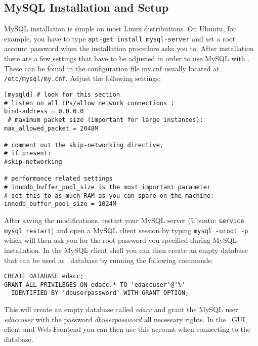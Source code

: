 \subsection{MySQL Installation and Setup}
MySQL installation is simple on most Linux distributions. On Ubuntu, for example, you
have to type \texttt{apt-get install mysql-server} and set a root account password
when the installation procedure asks you to.
 After installation there are a few settings
that have to be adjusted in order to use MySQL with \edacc. These can be found in the configuration file
my.cnf usually located at \texttt{/etc/mysql/my.cnf}. Adjust the following settings:
\begin{verbatim}
[mysqld] # look for this section
# listen on all IPs/allow network connections :
bind-address = 0.0.0.0
 # maximum packet size (important for large instances):
max_allowed_packet = 2048M

# comment out the skip-networking directive,
# if present:
#skip-networking

# performance related settings
# innodb_buffer_pool_size is the most important parameter
# set this to as much RAM as you can spare on the machine:
innodb_buffer_pool_size = 1024M
\end{verbatim}
After saving the modifications, restart your MySQL server (Ubuntu: \texttt{service mysql restart})
and open a MySQL client session by typing \texttt{mysql -uroot -p} which will then ask you for
the root password you specified during MySQL installation.
In the MySQL client shell you can then create an empty database that can be used as \edacc~database
by running the following commands:
\begin{verbatim}
CREATE DATABASE edacc;
GRANT ALL PRIVILEGES ON edacc.* TO 'edaccuser'@'%'
  IDENTIFIED BY 'dbuserpassword' WITH GRANT OPTION;
\end{verbatim}
This will create an empty database called \textit{edacc} and grant the MySQL user \textit{edaccuser}
with the password \textit{dbuserpassword} all necessary rights. In the \edacc~GUI, client and Web Frontend
you can then use this account when connecting to the database.
